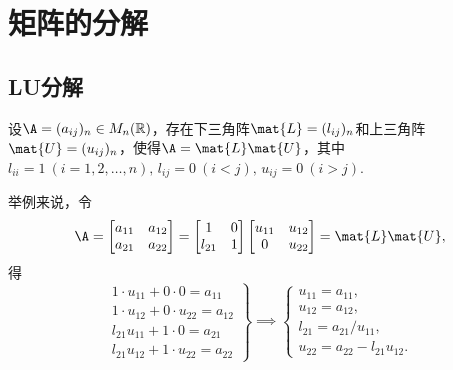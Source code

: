 \section{矩阵的分解}
\subsection{LU分解}
\begingroup
\def\L{\mat{L}}%
\def\U{\mat{U}}%
\begin{theorem}
设\(\A = (a_{ij})_n \in M_n(\mathbb{R})\)，存在下三角阵\(\L = (l_{ij})_n\)和上三角阵\(\U = (u_{ij})_n\)，使得\(\A = \L \U\)，其中\(l_{ii} = 1\ (i=1,2,\dotsc,n),\,%
l_{ij} = 0\ (i<j),\,%
u_{ij} = 0\ (i>j)\).
\end{theorem}

举例来说，令\[
\A = \begin{bmatrix}
a_{11} & a_{12} \\
a_{21} & a_{22}
\end{bmatrix} = \begin{bmatrix}
1 & 0 \\
l_{21} & 1
\end{bmatrix} \begin{bmatrix}
u_{11} & u_{12} \\
0 & u_{22}
\end{bmatrix} = \L \U,
\]得\[
\left.\begin{array}{r}
1 \cdot u_{11} + 0 \cdot 0 = a_{11} \\
1 \cdot u_{12} + 0 \cdot u_{22} = a_{12} \\
l_{21} u_{11} + 1 \cdot 0 = a_{21} \\
l_{21} u_{12} + 1 \cdot u_{22} = a_{22}
\end{array}\right\} \implies \left\{\begin{array}{l}
u_{11} = a_{11}, \\
u_{12} = a_{12}, \\
l_{21} = a_{21} / u_{11}, \\
u_{22} = a_{22} - l_{21} u_{12}.
\end{array}\right.
\]

